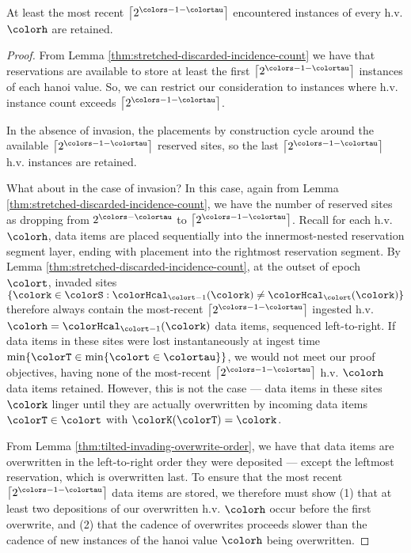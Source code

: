 \begin{lemma}
\label{thm:tilted-most-recent-retained}
At least the most recent $\left\lceil2^{\colors - 1 - \colortau}\right\rceil$ encountered instances of every h.v. $\colorh$ are retained.
\end{lemma}
\begin{proof}
From Lemma \ref{thm:stretched-discarded-incidence-count} we have that reservations are available to store at least the first $\left\lceil 2^{\colors - 1 - \colortau} \right\rceil$ instances of each hanoi value.
So, we can restrict our consideration to instances where h.v. instance count exceeds $\left\lceil 2^{\colors - 1 - \colortau} \right\rceil$.

In the absence of invasion, the placements by construction cycle around the available $\left\lceil 2^{\colors - 1 - \colortau} \right\rceil$ reserved sites, so the last $\left\lceil 2^{\colors - 1 - \colortau} \right\rceil$ h.v. instances are retained.

What about in the case of invasion?
In this case, again from Lemma \ref{thm:stretched-discarded-incidence-count}, we have the number of reserved sites as dropping from $2^{\colors - \colortau}$ to $\left\lceil 2^{\colors - 1 - \colortau} \right\rceil$.
Recall for each h.v. $\colorh$, data items are placed sequentially into the innermost-nested reservation segment layer, ending with placement into the rightmost reservation segment.
By Lemma \ref{thm:stretched-discarded-incidence-count}, at the outset of epoch $\colort$, invaded sites $\{\colork \in \colorS : \colorHcal_{\colort - 1}(\colork) \neq \colorHcal_{\colort}(\colork)\}$ therefore always contain the most-recent $\left\lceil 2^{\colors - 1 - \colortau} \right\rceil$ ingested h.v. $\colorh = \colorHcal_{\colort - 1}(\colork)$ data items, sequenced left-to-right.
If data items in these sites were lost instantaneously at ingest time $\min\{\colorT \in \min\{\colort \in \colortau\}\}$, we would not meet our proof objectives, having none of the most-recent $\left\lceil 2^{\colors - 1 - \colortau} \right\rceil$ h.v. $\colorh$ data items retained.
However, this is not the case --- data items in these sites $\colork$ linger until they are actually overwritten by incoming data items $\colorT \in \colort$ with $\colorK(\colorT) = \colork$.

From Lemma \ref{thm:tilted-invading-overwrite-order}, we have that data items are overwritten in the left-to-right order they were deposited --- except the leftmost reservation, which is overwritten last.
To ensure that the most recent $\left\lceil 2^{\colors - 1 - \colortau} \right\rceil$ data items are stored, we therefore must show (1) that at least two depositions of our overwritten h.v. $\colorh$ occur before the first overwrite, and (2) that the cadence of overwrites proceeds slower than the cadence of new instances of the hanoi value $\colorh$ being overwritten.


\end{proof}
